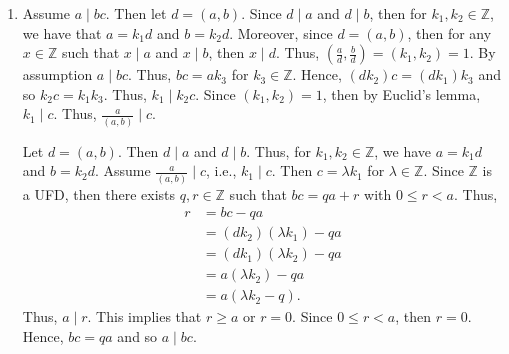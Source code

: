 \documentclass[12pt]{article}
\makeatletter
\theoremstyle{definition}
\theoremstyle{remark}
\renewenvironment{proof}[1][\proofname]{\par
  \pushQED{\qed}%
  \normalfont \topsep6\p@\@plus6\p@\relax
  \list{}{\leftmargin=0mm
          \rightmargin=4mm
          \settowidth{\itemindent}{\itshape#1}%
          \labelwidth=\itemindent
          \parsep=0pt \listparindent=\parindent 
  }
  \item[\hskip\labelsep
        \itshape
    #1\@addpunct{.}]\ignorespaces
}{%
  \popQED\endlist\@endpefalse
}
\let\oldproofname=\proofname
\renewcommand{\proofname}{\bf{\textit{\oldproofname}}}
\makeatother
\begin{document}
\begin{enumerate}[leftmargin=*]
\begin{proof}
                Assume $a\mid bc$. Then let $d=(a,b)$. Since $d\mid a$ and $d\mid b$, then for $k_1,k_2\in\mathbb{Z}$, we have that $a=k_1d$ and $b=k_2d$. Moreover, since $d=(a,b)$, then for any $x\in\mathbb{Z}$ such that $x\mid a$ and $x\mid b$, then $x\mid d$. Thus, $(\frac{a}{d},\frac{b}{d})=(k_1,k_2)=1$. By assumption $a\mid bc$. Thus, $bc=ak_3$ for $k_3\in\mathbb{Z}$. Hence, $(dk_2)c=(dk_1)k_3$ and so $k_2c=k_1k_3$. Thus, $k_1\mid k_2c$. Since $(k_1,k_2)=1$, then by Euclid's lemma, $k_1\mid c$. Thus, $\frac{a}{(a,b)}\mid c$.\par\hspace{4mm} Let $d=(a,b)$. Then $d\mid a$ and $d\mid b$. Thus, for $k_1,k_2\in\mathbb{Z}$, we have $a=k_1d$ and $b=k_2d$. Assume $\frac{a}{(a,b)}\mid c$, i.e., $k_1\mid c$. Then $c=\lambda k_1$ for $\lambda\in\mathbb{Z}$. Since $\mathbb{Z}$ is a UFD, then there exists $q,r\in\mathbb{Z}$ such that $bc=qa+r$ with $0\leq r<a$. Thus,
                    \begin{equation*}
                        \begin{split}
                            r &= bc-qa \\
                            &= (dk_2)(\lambda k_1)-qa \\
                            &= (dk_1)(\lambda k_2)-qa \\
                            &= a(\lambda k_2)-qa \\
                            &= a(\lambda k_2-q).
                        \end{split}
                    \end{equation*}
                Thus, $a\mid r$. This implies that $r\geq a$ or $r=0$. Since $0\leq r<a$, then $r=0$. Hence, $bc=qa$ and so $a\mid bc$.
            \end{proof}
    \end{enumerate}    
\end{document}
